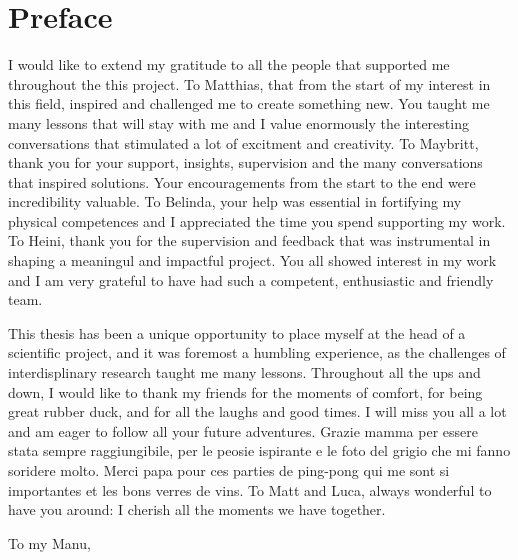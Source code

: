 \chapter*{Preface}

I would like to extend my gratitude to all the people that supported me throughout the this project. To Matthias, that from the start of my interest in this field, inspired and challenged me to create something new. You taught me many lessons that will stay with me and I value enormously the interesting conversations that stimulated a lot of excitment and creativity. To Maybritt, thank you for your support, insights, supervision and the many conversations that inspired solutions. Your encouragements from the start to the end were incredibility valuable. To Belinda, your help was essential in fortifying my physical competences and I appreciated the time you spend supporting my work. To Heini, thank you for the supervision and feedback that was instrumental in shaping a meaningul and impactful project. You all showed interest in my work and I am very grateful to have had such a competent, enthusiastic and friendly team.

This thesis has been a unique opportunity to place myself at the head of a scientific project, and it was foremost a humbling experience, as the challenges of interdisplinary research taught me many lessons. Throughout all the ups and down, I would like to thank my friends for the moments of comfort, for being great rubber duck, and for all the laughs and good times. I will miss you all a lot and am eager to follow all your future adventures. Grazie mamma per essere stata sempre raggiungibile, per le peosie ispirante e le foto del grigio che mi fanno soridere molto. Merci papa pour ces parties de ping-pong qui me sont si importantes et les bons verres de vins. To Matt and Luca, always wonderful to have you around: I cherish all the moments we have together. 

To my Manu, 


